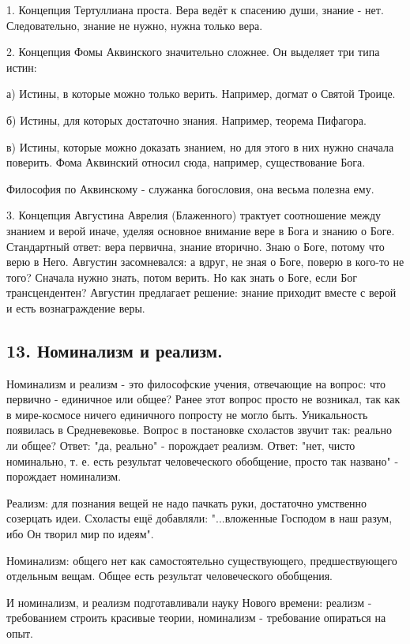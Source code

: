 \documentclass[a4paper, 12pt]{article}
\begin{document}
1. Концепция Тертуллиана проста.
Вера ведёт к спасению души, знание - нет.
Следовательно, знание не нужно, нужна только вера.

2. Концепция Фомы Аквинского значительно сложнее.
Он выделяет три типа истин:

а) Истины, в которые можно только верить.
Например, догмат о Святой Троице.

б) Истины, для которых достаточно знания.
Например, теорема Пифагора.

в) Истины, которые можно доказать знанием, но для этого в них нужно сначала поверить.
Фома Аквинский относил сюда, например, существование Бога.

Философия по Аквинскому - служанка богословия, она весьма полезна ему.

3. Концепция Августина Аврелия (Блаженного) трактует соотношение между знанием и верой иначе, уделяя основное внимание вере в Бога и знанию о Боге.
Стандартный ответ: вера первична, знание вторично.
Знаю о Боге, потому что верю в Него.
Августин засомневался: а вдруг, не зная о Боге, поверю в кого-то не того?
Сначала нужно знать, потом верить.
Но как знать о Боге, если Бог трансцендентен?
Августин предлагает решение: знание приходит вместе с верой и есть вознаграждение веры.


\subsection*{\textbf{13. Номинализм и реализм.}}

Номинализм и реализм - это философские учения, отвечающие на вопрос: что первично - единичное или общее?
Ранее этот вопрос просто не возникал, так как в мире-космосе ничего единичного попросту не могло быть.
Уникальность появилась в Средневековье.
Вопрос в постановке схоластов звучит так: реально ли общее?
Ответ: "да, реально" - порождает реализм.
Ответ: "нет, чисто номинально, т. е. есть результат человеческого обобщение, просто так названо" - порождает номинализм.

Реализм: для познания вещей не надо пачкать руки, достаточно умственно созерцать идеи.
Схоласты ещё добавляли: "...вложенные Господом в наш разум, ибо Он творил мир по идеям".

Номинализм: общего нет как самостоятельно существующего, предшествующего отдельным вещам.
Общее есть результат человеческого обобщения.

И номинализм, и реализм подготавливали науку Нового времени:
реализм - требованием строить красивые теории, номинализм - требование опираться на опыт.
\end{document}
